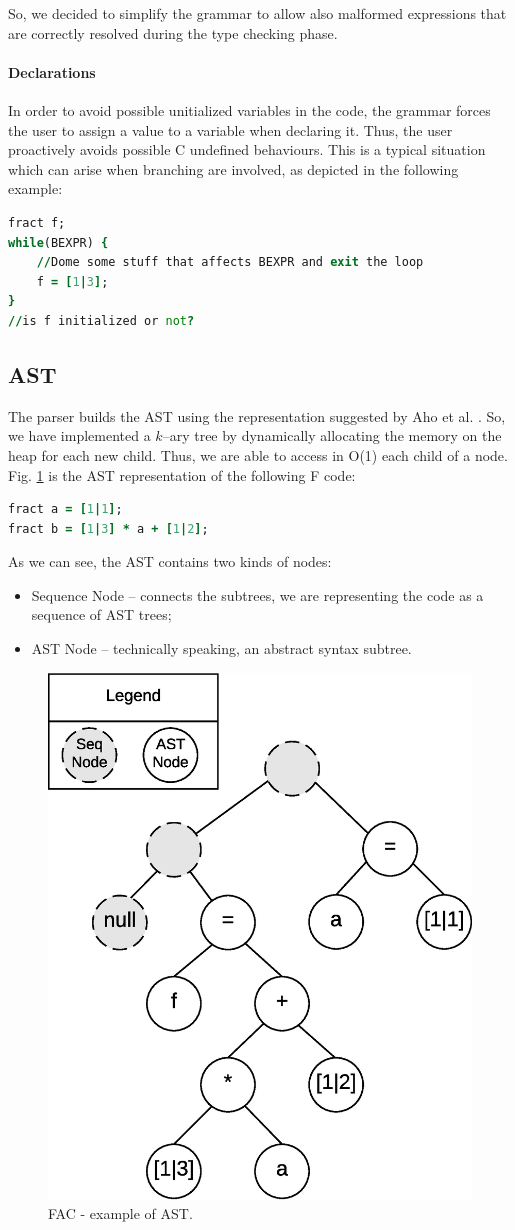 So, we decided to simplify the grammar to allow also malformed expressions that
are correctly resolved during the type checking phase.


\paragraph{Declarations}

In order to avoid possible unitialized variables in the code, the grammar
forces the user to assign a value to a variable when declaring it.
Thus, the user proactively avoids possible C undefined behaviours.
This is a typical situation which can arise
when branching are involved, as depicted in the following example:
\begin{lstlisting}[language=F, caption={Example of possible uninitialized 
variable.},captionpos=b,label=f-code0, frame = single]
fract f;
while(BEXPR) {
    //Dome some stuff that affects BEXPR and exit the loop
    f = [1|3];
}
//is f initialized or not?
\end{lstlisting}

\subsection{AST}
The parser builds the AST using the representation suggested by Aho et al. 
\cite{dragonbook}. So, we have implemented a $k$--ary
tree by dynamically allocating the memory on the heap for each new child. Thus, 
we are able to access in O(1) each child of a node.
Fig. \ref{fig:ast} is the AST representation of the following F code:
\begin{lstlisting}[language=F,caption={Example of F code},captionpos=b,
label=f-code1, frame=single]
fract a = [1|1];
fract b = [1|3] * a + [1|2];
\end{lstlisting}
As we can see, the AST contains two kinds of nodes:
\begin{itemize}
	\item Sequence Node -- connects the subtrees, we are representing the 
	code as a sequence of AST trees;
	\item AST Node -- technically speaking, an abstract syntax subtree.
\end{itemize}
\begin{figure}[H]
  \centering
  \includegraphics[width=.5\columnwidth]{img/eps/ast.eps}
  \caption{FAC - example of AST.}
  \label{fig:ast}
\end{figure}


